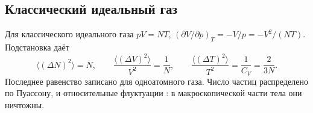 \documentclass[../final.tex]{subfiles}
\begin{document}
\subsection{Классический идеальный газ}
Для классического идеального газа $pV=NT$,
$(\partial V/\partial p)_T=-V/p=-V^2/(NT)$.
Подстановка даёт
\begin{equation*}
 \langle(\Delta N)^2\rangle=N,\qquad
 \frac{\langle(\Delta V)^2\rangle}{V^2}=\frac1N,\qquad
 \frac{\langle(\Delta T)^2\rangle}{T^2}=\frac1{C_V}=\frac{2}{3N}.
\end{equation*}
Последнее равенство записано для одноатомного газа. Число частиц
распределено по Пуассону, и относительные флуктуации
: в макроскопической части тела они ничтожны.
\end{document}
